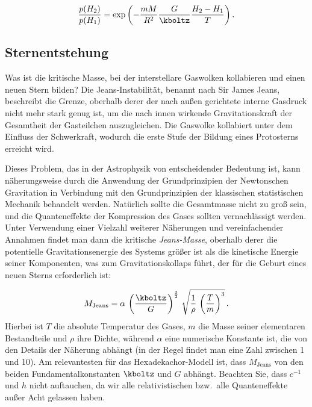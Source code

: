 \begin{equation*}\label{eq:barometric_height_full_2}
  \frac{p(H_2)}{p(H_1)}=\exp\left(-\frac{m M}{R^2}\frac{G}{\kboltz} \frac{H_2-H_1}{T}\right).
\end{equation*}


\subsection*{Sternentstehung}

Was ist die kritische Masse, bei der interstellare Gaswolken kollabieren und einen neuen Stern bilden? Die Jeans-Instabilität, benannt nach Sir James Jeans, beschreibt die Grenze, oberhalb derer der nach außen gerichtete interne Gasdruck nicht mehr stark genug ist, um die nach innen wirkende Gravitationskraft der Gesamtheit der Gasteilchen auszugleichen. Die Gaswolke kollabiert unter dem Einfluss der Schwerkraft, wodurch die erste Stufe der Bildung eines Protosterns erreicht wird.

Dieses Problem, das in der Astrophysik von entscheidender Bedeutung ist, kann näherungsweise durch die Anwendung der Grundprinzipien der Newtonschen Gravitation in Verbindung mit den Grundprinzipien der klassischen statistischen Mechanik behandelt werden. Natürlich sollte die Gesamtmasse nicht zu groß sein, und die Quanteneffekte der Kompression des Gases sollten vernachlässigt werden. Unter Verwendung einer Vielzahl weiterer Näherungen und vereinfachender Annahmen findet man dann die kritische \emph{Jeans-Masse}, oberhalb derer die potentielle Gravitationsenergie des Systems größer ist als die kinetische Energie seiner Komponenten, was zum Gravitationskollaps führt, der für die Geburt eines neuen Sterns erforderlich ist:

\begin{equation*}
  M_{\mathrm {Jeans}}=\alpha\,
    \left(\frac {\kboltz}{G}\right)^{\frac{3}{2}}\,
    \sqrt {{\frac {1}{\rho}}\, 
    \left({\frac {T}{m}}\right)^3}\,.
\end{equation*}
%
Hierbei ist $T$ die absolute Temperatur des Gases, $m$ die Masse seiner elementaren Bestandteile und $\rho$ ihre Dichte, während $\alpha$ eine numerische Konstante ist, die von den Details der Näherung abhängt (in der Regel findet man eine Zahl zwischen 1 und 10). Am relevantesten für das Hexadekachor-Modell ist, dass $M_{\mathrm {Jeans}}$ von den beiden Fundamentalkonstanten $\kboltz$ und $G$ abhängt. Beachten Sie, dass $c^{-1}$ und $h$ nicht auftauchen, da wir alle relativistischen bzw.\ alle Quanteneffekte außer Acht gelassen haben.


